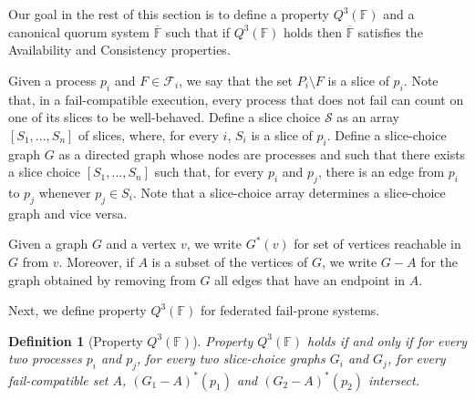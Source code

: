 \documentclass[11pt,letterpaper]{article}
\newtheorem{definition}{Definition}
\begin{document}
Our goal in the rest of this section is to define a property $Q^3(\mathbb{F})$ and a canonical quorum system $\overline{\mathbb{F}}$ such that if $Q^3(\mathbb{F})$ holds then $\overline{\mathbb{F}}$ satisfies the Availability and Consistency properties.



Given a process $p_i$ and $F\in \mathcal{F}_i$, we say that the set $P_i\setminus F$ is a slice of $p_i$.
Note that, in a fail-compatible execution, every process that does not fail can count on one of its slices to be well-behaved.
Define a slice choice $\mathcal{S}$ as an array $\left[S_1,...,S_n\right]$ of slices, where, for every $i$, $S_i$ is a slice of $p_i$.
Define a slice-choice graph $G$ as a directed graph whose nodes are processes and such that there exists a slice choice $\left[S_1,...,S_n\right]$ such that, for every $p_i$ and $p_j$, there is an edge from $p_i$ to $p_j$ whenever $p_j\in S_i$. Note that a slice-choice array determines a slice-choice graph and vice versa.

Given a graph $G$ and a vertex $v$, we write $G^*(v)$ for set of vertices reachable in $G$ from $v$. Moreover, if $A$ is a subset of the vertices of $G$, we write $G-A$ for the graph obtained by removing from $G$ all edges that have an endpoint in $A$.



Next, we define property $Q^3(\mathbb{F})$ for federated fail-prone systems.
\begin{definition}[Property $Q^3(\mathbb{F})$]
  Property $Q^3(\mathbb{F})$ holds if and only if for every two processes $p_i$ and $p_j$, for every two slice-choice graphs $G_i$ and $G_j$, for every fail-compatible set $A$, $\left(G_1-A\right)^*(p_1)$ and $\left(G_2-A\right)^*(p_2)$ intersect.
\end{definition}
\end{document}
